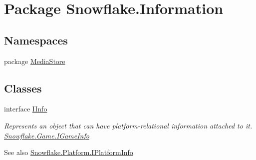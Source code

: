 \hypertarget{namespace_snowflake_1_1_information}{}\section{Package Snowflake.\+Information}
\label{namespace_snowflake_1_1_information}
\subsection*{Namespaces}
\begin{DoxyCompactItemize}
\item 
package \hyperlink{namespace_snowflake_1_1_information_1_1_media_store}{Media\+Store}
\end{DoxyCompactItemize}
\subsection*{Classes}
\begin{DoxyCompactItemize}
\item 
interface \hyperlink{interface_snowflake_1_1_information_1_1_i_info}{I\+Info}
\begin{DoxyCompactList}\small\item\em Represents an object that can have platform-\/relational information attached to it. \hyperlink{interface_snowflake_1_1_game_1_1_i_game_info}{Snowflake.\+Game.\+I\+Game\+Info} \begin{DoxySeeAlso}{See also}
\hyperlink{interface_snowflake_1_1_platform_1_1_i_platform_info}{Snowflake.\+Platform.\+I\+Platform\+Info}


\end{DoxySeeAlso}
\end{DoxyCompactList}\end{DoxyCompactItemize}
